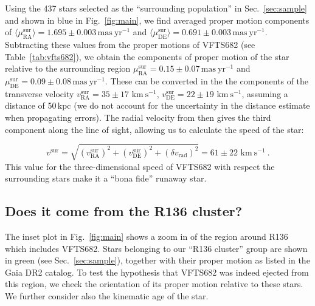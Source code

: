\documentclass{aa}
\newcommand{\kms}{{\,\mathrm{km\ s^{-1}}}}
\DeclareRobustCommand{\Figref}[1]{Fig.~\ref{#1}}
\DeclareRobustCommand{\Tabref}[1]{Table~\ref{#1}}
\DeclareRobustCommand{\Secref}[1]{Sec.~\ref{#1}}
\begin{document}
Using the 437 stars selected as the ``surrounding population'' in
\Secref{sec:sample} and shown in blue in \Figref{fig:main}, we find averaged proper motion components of
$\langle\mu_\mathrm{RA}^\mathrm{sur}\rangle = 1.695\pm0.003\,\mathrm{mas\ yr^{-1}}$ and
$\langle\mu_\mathrm{DE}^\mathrm{sur}\rangle = 0.691\pm0.003\,\mathrm{mas\ yr^{-1}}$. Subtracting these values from the
proper motions of VFTS682 (see \Tabref{tab:vfts682}), we obtain the
components of proper motion of the star relative to the surrounding region
$\mu^\mathrm{sur}_\mathrm{RA} = 0.15\pm 0.07\,\mathrm{mas\ yr^{-1}}$ and $\mu^\mathrm{sur}_\mathrm{DE} =
0.09\pm 0.08\,\mathrm{mas\ yr^{-1}}$. %
These can be converted in the
the components of the transverse velocity $v^\mathrm{sur}_\mathrm{RA}=35\pm17\,\kms$,
$v^\mathrm{sur}_\mathrm{DE}=22\pm19\,\kms$, assuming a distance of
50\,kpc (we do not account for the uncertainty in the distance
estimate when propagating errors). The radial velocity from
\cite{bestenlehner:11} then gives the third component along
the line of sight, allowing us to calculate the speed of the star:

\begin{equation}
  \label{eq:speed_around}
  v^\mathrm{sur} = \sqrt{\left(v^\mathrm{sur}_\mathrm{RA}\right)^2
    +\left(v^\mathrm{sur}_\mathrm{DE}\right)^2+\left(\delta v_\mathrm{rad}\right)^2} = 61 \pm 22
  \, \kms \ .
\end{equation}
This value for the three-dimensional speed of VFTS682 with respect the
surrounding stars make it a ``bona fide'' runaway star.

\subsection{Does it come from the R136 cluster?}
\label{sec:r136_origin}

The inset plot in \Figref{fig:main} shows a zoom in of the region
around R136 which includes VFTS682. Stars belonging to our ``R136
cluster'' group are shown in green (see \Secref{sec:sample}), together with their proper motion
as listed in the Gaia DR2 catalog.
To test the hypothesis that VFTS682 was indeed ejected from this region, we check the
orientation of its proper motion relative to these stars. We further
consider also the kinematic age of the star.
\end{document}
